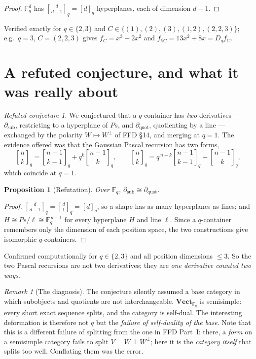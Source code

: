 \documentclass[11pt,a4paper]{article}
\newtheorem{proposition}[theorem]{Proposition}
\theoremstyle{definition}
\theoremstyle{remark}
\newtheorem{remark}[theorem]{Remark}
\newtheorem{refuted}[theorem]{Refuted conjecture}
\newcommand{\FF}{\mathbb{F}}
\newcommand{\cat}[1]{\mathbf{#1}}
\newcommand{\Vect}{\cat{Vect}}
\newcommand{\qbin}[2]{\genfrac{[}{]}{0pt}{}{#1}{#2}_{q}}
\begin{document}
\begin{proof}
$\FF_q^{d}$ has $\qbin{d}{d-1} = [d]_q$ hyperplanes, each of dimension $d-1$.
\end{proof}

Verified exactly for $q \in \{2,3\}$ and
$C \in \{(1),(2),(3),(1,2),(2,2,3)\}$; e.g.\ $q = 3$, $C = (2,2,3)$ gives
$f_C = x^{3} + 2x^{2}$ and $f_{\partial C} = 13x^{2} + 8x = D_q f_C$.

\section{A refuted conjecture, and what it was really about}\label{sec:refuted}

\begin{refuted}\label{conj:two}
We conjectured that a $q$-container has \emph{two} derivatives ---
$\partial_{\mathrm{sub}}$, restricting to a hyperplane of $P s$, and
$\partial_{\mathrm{quot}}$, quotienting by a line --- exchanged by the polarity
$W \mapsto W^{\perp}$ of FFD \S14, and merging at $q = 1$. The evidence offered
was that the Gaussian Pascal recursion has two forms,
\[
  \qbin{n}{k} = \qbin{n-1}{k-1} + q^{k}\qbin{n-1}{k},
  \qquad
  \qbin{n}{k} = q^{\,n-k}\qbin{n-1}{k-1} + \qbin{n-1}{k},
\]
which coincide at $q = 1$.
\end{refuted}

\begin{proposition}[Refutation]
Over $\FF_q$, $\partial_{\mathrm{sub}} \cong \partial_{\mathrm{quot}}$.
\end{proposition}

\begin{proof}
$\qbin{d}{d-1} = \qbin{d}{1} = [d]_q$, so a shape has as many hyperplanes as
lines; and $H \cong P s / \ell \cong \FF_q^{\,d-1}$ for every hyperplane $H$ and
line $\ell$. Since a $q$-container remembers only the dimension of each position
space, the two constructions give isomorphic $q$-containers.
\end{proof}

Confirmed computationally for $q \in \{2,3\}$ and all position dimensions
$\le 3$. So the two Pascal recursions are not two derivatives; they are
\emph{one derivative counted two ways}.

\begin{remark}[The diagnosis]
The conjecture silently assumed a base category in which subobjects and quotients
are not interchangeable. $\Vect_{\FF_q}$ is semisimple: every short exact
sequence splits, and the category is self-dual. The interesting deformation is
therefore not $q$ but the \emph{failure of self-duality of the base}. Note that
this is a different failure of splitting from the one in FFD Part~I: there, a
\emph{form} on a semisimple category fails to split $V = W \perp W^{\perp}$; here
it is the \emph{category itself} that splits too well. Conflating them was the
error.
\end{remark}
\end{document}
